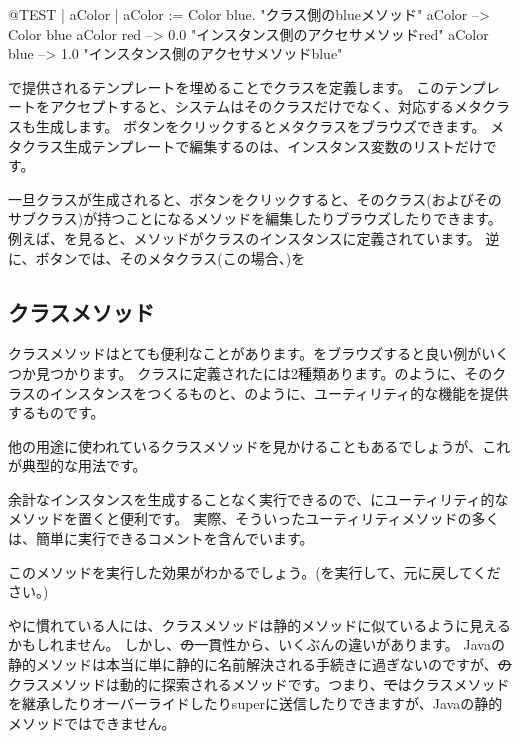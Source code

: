 \documentclass[a4paper,10pt,twoside]{book}
\begin{document}
\begin{code}{@TEST | aColor |}
aColor := Color blue.               "クラス側のblueメソッド"
aColor        --> Color blue
aColor red  --> 0.0         "インスタンス側のアクセサメソッドred"
aColor blue --> 1.0        "インスタンス側のアクセサメソッドblue"
\end{code}

で提供されるテンプレートを埋めることでクラスを定義します。
このテンプレートをアクセプトすると、システムはそのクラスだけでなく、対応するメタクラスも生成します。
ボタンをクリックするとメタクラスをブラウズできます。
メタクラス生成テンプレートで編集するのは、インスタンス変数のリストだけです。

一旦クラスが生成されると、ボタンをクリックすると、そのクラス(およびそのサブクラス)が持つことになるメソッドを編集したりブラウズしたりできます。例えば、を見ると、メソッドがクラスのインスタンスに定義されています。
逆に、ボタンでは、そのメタクラス(この場合、)を

\subsection{クラスメソッド} 

クラスメソッドはとても便利なことがあります。をブラウズすると良い例がいくつか見つかります。
クラスに定義されたには2種類あります。のように、そのクラスのインスタンスをつくるものと、のように、ユーティリティ的な機能を提供するものです。

他の用途に使われているクラスメソッドを見かけることもあるでしょうが、これが典型的な用法です。

余計なインスタンスを生成することなく実行できるので、にユーティリティ的なメソッドを置くと便利です。
実際、そういったユーティリティメソッドの多くは、簡単に実行できるコメントを含んでいます。

このメソッドを実行した効果がわかるでしょう。(を実行して、元に戻してください。)

やに慣れている人には、クラスメソッドは静的メソッドに似ているように見えるかもしれません。
しかし、\st の一貫性から、いくぶんの違いがあります。
Javaの静的メソッドは本当に単に静的に名前解決される手続きに過ぎないのですが、\st のクラスメソッドは動的に探索されるメソッドです。つまり、\st ではクラスメソッドを継承したりオーバーライドしたりsuperに送信したりできますが、Javaの静的メソッドではできません。
\end{document}
